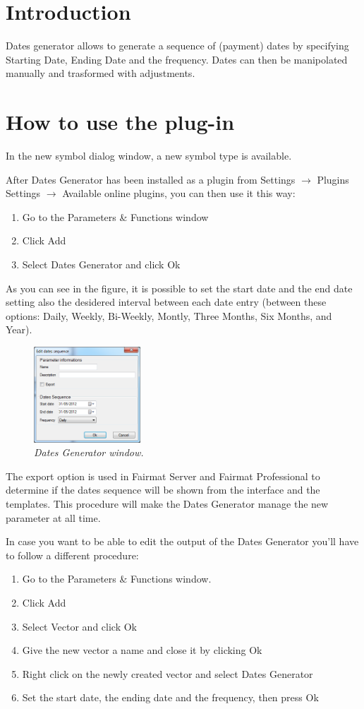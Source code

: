 \newcommand{\pluginName}{Dates Generator}
\newcommand{\pluginVersion}{1.0}




\section{Introduction}
Dates generator allows to generate a sequence of (payment) dates by specifying Starting Date, Ending Date and the frequency.  Dates can then be manipolated manually and trasformed with adjustments.
\section{How to use the plug-in}
In the new symbol dialog window, a new symbol type is available.

After Dates Generator has been installed as a plugin from Settings $\to$ Plugins Settings 
$\to$ Available online plugins, you can then use it this way: 
\begin{enumerate}
\item Go to the Parameters \& Functions window
\item Click Add
\item Select Dates Generator and click Ok
\end{enumerate}
As you can see in the figure\label{fig:DG}, it is possible to set the start date and the end date setting also the desidered interval between each date entry (between these options: Daily, Weekly, Bi-Weekly, Montly, Three Months, Six Months, and Year).
\begin{figure}[h!]
\includegraphics[width=4cm]{DG_img}
\centering
\caption{\small{\emph{Dates Generator window.}}}
\label{fig:DG}
\end{figure}
The export option is used in Fairmat Server and Fairmat Professional to determine if the dates sequence will be shown from the interface and the templates. This procedure will make the Dates Generator manage the new parameter at all time. 

In case you want to be able to edit the output of the Dates Generator you'll have to follow a different procedure:
\begin{enumerate}
\item Go to the Parameters \& Functions window.
\item Click Add
\item Select Vector and click Ok
\item Give the new vector a name and close it by clicking Ok
\item Right click on the newly created vector and select Dates Generator
\item Set the start date, the ending date and the frequency, then press Ok
\end{enumerate}

